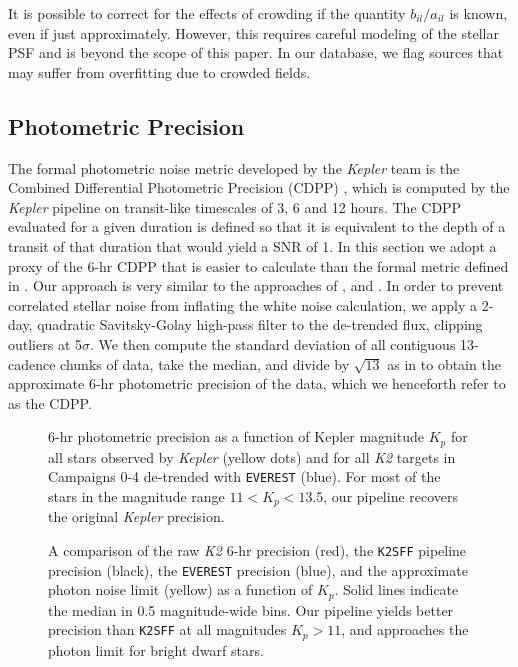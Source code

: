\documentclass[]{emulateapj}
\begin{document}
It is possible to correct for the effects of crowding if the quantity $b_{il}/a_{il}$
is known, even if just approximately. However, this requires careful modeling of the
stellar PSF and is beyond the scope of this paper. In our database, we flag sources
that may suffer from overfitting due to crowded fields.

\subsection{Photometric Precision}
\label{sec:precision}
The formal photometric noise metric developed by the \emph{Kepler} team is the
Combined Differential Photometric Precision (CDPP) \citep{CHR12}, which is computed
by the \emph{Kepler} pipeline on transit-like timescales of 3, 6 and 12 hours.
The CDPP evaluated for a given duration is defined so that it is equivalent to the 
depth of a transit of that duration that would yield a SNR of 1. In this section we adopt a proxy 
of the 6-hr CDPP that is easier to calculate than
the formal metric defined in \cite{CHR12}. Our approach is very similar to the approaches
of \cite{GIL11}, \cite{VJ14} and \cite{AIG16}. In order to prevent correlated stellar
noise from inflating the white noise calculation, we apply a 2-day, quadratic Savitsky-Golay 
high-pass filter to the de-trended flux, clipping
outliers at 5$\sigma$. We then compute the standard deviation of all contiguous 13-cadence
chunks of data, take the median, and divide by $\sqrt{13}$ as in \cite{VJ14} to obtain
the approximate 6-hr photometric precision of the data, which we henceforth refer to
as the CDPP.

\label{sec:precision}
\begin{figure}[h]
  \begin{center}
       \caption{6-hr photometric precision as a function of Kepler magnitude $K_p$
                for all stars observed by \emph{Kepler} (yellow dots) and for
                all \emph{K2} targets in Campaigns 0-4 de-trended with \texttt{EVEREST}
                (blue). For most of the stars in the magnitude range $11 < K_p < 13.5$,
                our pipeline recovers the original \emph{Kepler} precision.}
     \label{fig:precision1}
  \end{center}
\end{figure}
\begin{figure}[h]
  \begin{center}
       \caption{A comparison of the raw \emph{K2} 6-hr precision (red), the \texttt{K2SFF}
       pipeline precision (black), the \texttt{EVEREST} precision (blue), and the
       approximate photon noise limit (yellow) as a function of $K_p$. Solid lines
       indicate the median in 0.5 magnitude-wide bins. Our pipeline yields better
       precision than \texttt{K2SFF} at all magnitudes $K_p > 11$, and approaches
       the photon limit for bright dwarf stars.}
     \label{fig:precision2}
  \end{center}
\end{figure}
\end{document}
